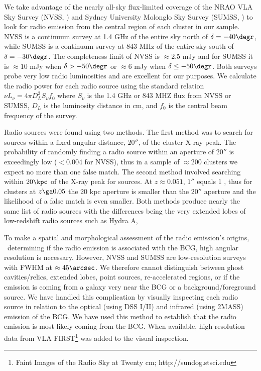 \documentclass{emulateapj}
\begin{document}
We take advantage of the nearly all-sky flux-limited coverage of the
NRAO VLA Sky Survey (NVSS, \citealt{1998AJ....115.1693C}) and Sydney
University Molonglo Sky Survey (SUMSS, \citealt{1999AJ....117.1578B,
  2003MNRAS.342.1117M}) to look for radio emission from the central
region of each cluster in our sample. NVSS is a continuum survey at
1.4 GHz of the entire sky north of $\delta = -40\degr$, while SUMSS is
a continuum survey at 843 MHz of the entire sky south of $\delta =
-30\degr$. The completeness limit of NVSS is $\approx 2.5$ mJy and for
SUMSS it is $\approx 10$ mJy when $\delta > -50\degr$ or $\approx 6$
mJy when $\delta \leq -50\degr$. Both surveys probe very low radio
luminosities and are excellent for our purposes. We calculate the
radio power for each radio source using the standard relation $\nu
L_{\nu} = 4 \pi D_L^2 S_{\nu} f_0$ where $S_{\nu}$ is the 1.4 GHz or
843 MHZ flux from NVSS or SUMSS, $D_L$ is the luminosity distance in
cm, and $f_0$ is the central beam frequency of the survey.

Radio sources were found using two methods. The first method was to
search for sources within a fixed angular distance, $20''$, of the
cluster X-ray peak. The probability of randomly finding a radio source
within an aperture of $20''$ is exceedingly low ($< 0.004$ for NVSS),
thus in a sample of $\approx 200$ clusters we expect no more than one
false match. The second method involved searching within $20\kpc$ of
the X-ray peak for sources. At $z \approx 0.051$, $1''$ equals 1 \kpc,
thus for clusters at $z \ga 0.05$ the 20 kpc aperture is smaller than
the $20''$ aperture and the likelihood of a false match is even
smaller. Both methods produce nearly the same list of radio sources
with the differences being the very extended lobes of low-redshift
radio sources such as Hydra A,

To make a spatial and morphological assessment of the radio emission's
origins, \ie\ determining if the radio emission is associated with the
BCG, high angular resolution is necessary. However, NVSS and SUMSS are
low-resolution surveys with FWHM at $\approx 45\arcsec$. We therefore
cannot distinguish between ghost cavities/relics, extended lobes,
point sources, re-accelerated regions, or if the emission is coming
from a galaxy very near the BCG or a background/foreground source. We
have handled this complication by visually inspecting each radio
source in relation to the optical (using DSS I/II) and infrared (using
2MASS) emission of the BCG. We have used this method to establish that
the radio emission is most likely coming from the BCG. When available,
high resolution data from VLA FIRST\footnote{Faint Images of the Radio
 Sky at Twenty cm; http://sundog.stsci.edu} was added to the
visual inspection.
\end{document}
